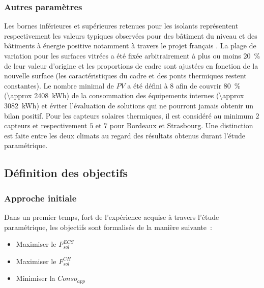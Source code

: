 \subsubsection{Autres paramètres} %
\label{ssub:autres_parametres}
Les bornes inférieures et supérieures retenues pour les isolants représentent respectivement les valeurs typiques observées
pour des bâtiment du niveau  et des bâtiments à énergie positive notamment à
travers le projet français .
La plage de variation pour les surfaces vitrées a été fixée arbitrairement à plus ou moins
\SI{20}{\percent} de leur valeur d’origine et les proportions de cadre sont ajustées
en fonction de la nouvelle surface (les caractéristiques du cadre et des ponts thermiques
restent constantes).
Le nombre minimal de $PV$ a été défini à $8$ afin de couvrir \SI{80}{\percent} (\SI{\approx
2408}{\kWh}) de la consommation des équipements internes (\SI{\approx 3082}{\kWh}) et éviter
l’évaluation de solutions qui ne pourront jamais obtenir un bilan positif.
Pour les capteurs solaires thermiques, il est considéré au minimum $2$ capteurs et respectivement
$5$ et $7$ pour Bordeaux et Strasbourg. Une distinction est faite entre les deux climats
au regard des résultats obtenus durant l’étude paramétrique.



\subsection{Définition des objectifs} %
\label{sub:definition_des_objectifs}
\subsubsection{Approche initiale} %
\label{ssub:approche_initiale}
\noindent Dans un premier temps, fort de l’expérience acquise à travers l’étude paramétrique,
les objectifs sont formalisés de la manière suivante~:
\begin{itemize}
  \item Maximiser le $F_{sol}^{ECS}$
  \item Maximiser le $F_{sol}^{CH}$
  \item Minimiser la $Conso_{app}$
\end{itemize}

